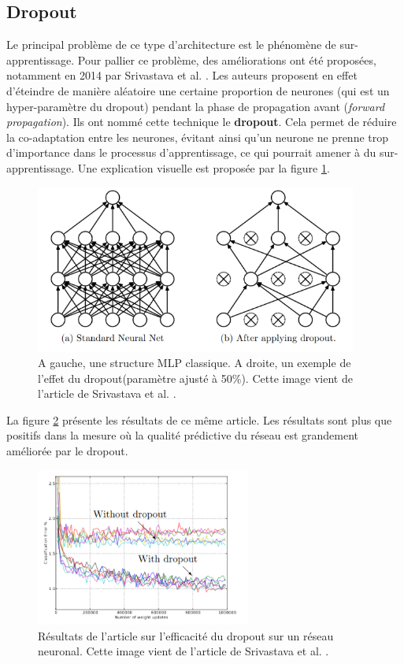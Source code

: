 \subsection{Dropout}

Le principal problème de ce type d'architecture est le phénomène de sur-apprentissage. Pour pallier ce problème, des améliorations ont été proposées, notamment en 2014 par Srivastava et al. \cite{srivastava_dropout_nodate}. Les auteurs proposent en effet d'éteindre de manière aléatoire une certaine proportion de neurones (qui est un hyper-paramètre du dropout) pendant la phase de propagation avant (\textit{forward propagation}). Ils ont nommé cette technique le \textbf{dropout}. Cela permet de réduire la co-adaptation entre les neurones, évitant ainsi qu'un neurone ne prenne trop d'importance dans le processus d'apprentissage, ce qui pourrait amener à du sur-apprentissage. Une explication visuelle est proposée par la figure \ref{dropout}.

\begin{figure}[!h]
\centering
\includegraphics[width=300pt]{images/cnn/dropout.png}
\caption{A gauche, une structure MLP classique. A droite, un exemple de l'effet du dropout(paramètre ajusté à 50\%). Cette image vient de l'article de Srivastava et al. \cite{srivastava_dropout_nodate}.}
\label{dropout}
\end{figure}

La figure \ref{dropout_article} présente les résultats de ce même article. Les résultats sont plus que positifs dans la mesure où la qualité prédictive du réseau est grandement améliorée par le dropout.

\begin{figure}[!h]
\centering
\includegraphics[width=200pt]{images/cnn/dropout_article.png}
\caption{Résultats de l'article sur l'efficacité du dropout sur un réseau neuronal. Cette image vient de l'article de Srivastava et al. \cite{srivastava_dropout_nodate}.}
\label{dropout_article}
\end{figure}
 
